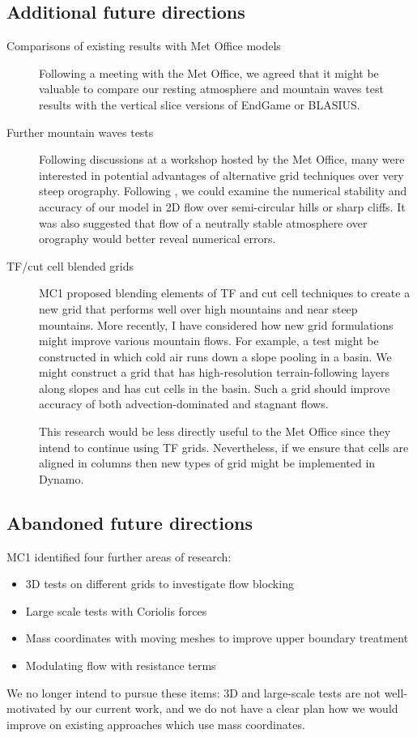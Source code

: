 \documentclass[a4paper]{article}
\begin{document}
\subsection*{Additional future directions}
\begin{description}
	\item[Comparisons of existing results with Met Office models]{Following a meeting with the Met Office, we agreed that it might be valuable to compare our resting atmosphere and mountain waves test results with the vertical slice versions of EndGame or BLASIUS.}
	\item[Further mountain waves tests]{Following discussions at a workshop hosted by the Met Office, many were interested in potential advantages of alternative grid techniques over very steep orography.  Following \citet{yamazaki-satomura2010}, we could examine the numerical stability and accuracy of our model in 2D flow over semi-circular hills or sharp cliffs.  It was also suggested that flow of a neutrally stable atmosphere over orography would better reveal numerical errors.}
	\item[TF/cut cell blended grids]{
MC1 proposed blending elements of TF and cut cell techniques to create a new grid that performs well over high mountains and near steep mountains.
More recently, I have considered how new grid formulations might improve various mountain flows.  For example, a test might be constructed in which cold air runs down a slope pooling in a basin.  We might construct a grid that has high-resolution terrain-following layers along slopes and has cut cells in the basin.  Such a grid should improve accuracy of both advection-dominated and stagnant flows.

This research would be less directly useful to the Met Office since they intend to continue using TF grids.  Nevertheless, if we ensure that cells are aligned in columns then new types of grid might be implemented in Dynamo.}
\end{description}

\subsection*{Abandoned future directions}
MC1 identified four further areas of research:
\begin{itemize}
	\item 3D tests on different grids to investigate flow blocking
	\item Large scale tests with Coriolis forces
	\item Mass coordinates with moving meshes to improve upper boundary treatment
	\item Modulating flow with resistance terms
\end{itemize}
We no longer intend to pursue these items: 3D and large-scale tests are not well-motivated by our current work, and we do not have a clear plan how we would improve on existing approaches which use mass coordinates. 
\end{document}
